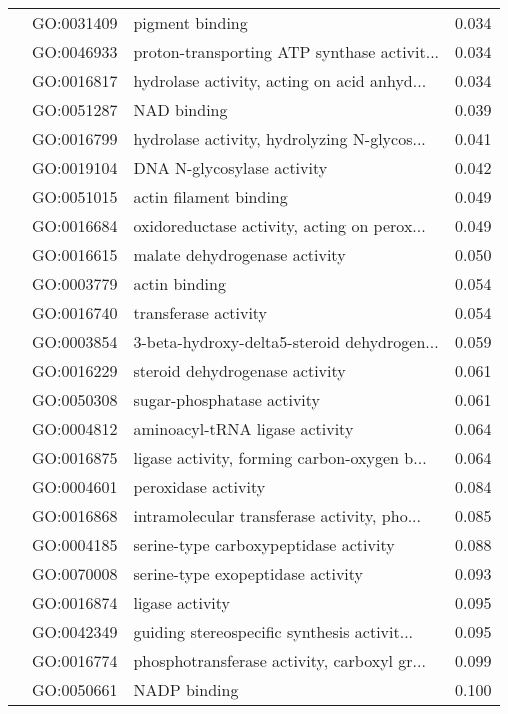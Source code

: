 \begin{longtable}{lllr}
   & GO:0031409 &                              pigment binding &         0.034 \\
   & GO:0046933 &  proton-transporting ATP synthase activit... &         0.034 \\
   & GO:0016817 &  hydrolase activity, acting on acid anhyd... &         0.034 \\
   & GO:0051287 &                                  NAD binding &         0.039 \\
   & GO:0016799 &  hydrolase activity, hydrolyzing N-glycos... &         0.041 \\
   & GO:0019104 &                   DNA N-glycosylase activity &         0.042 \\
   & GO:0051015 &                       actin filament binding &         0.049 \\
   & GO:0016684 &  oxidoreductase activity, acting on perox... &         0.049 \\
   & GO:0016615 &                malate dehydrogenase activity &         0.050 \\
   & GO:0003779 &                                actin binding &         0.054 \\
   & GO:0016740 &                         transferase activity &         0.054 \\
   & GO:0003854 &  3-beta-hydroxy-delta5-steroid dehydrogen... &         0.059 \\
   & GO:0016229 &               steroid dehydrogenase activity &         0.061 \\
   & GO:0050308 &                   sugar-phosphatase activity &         0.061 \\
   & GO:0004812 &               aminoacyl-tRNA ligase activity &         0.064 \\
   & GO:0016875 &  ligase activity, forming carbon-oxygen b... &         0.064 \\
   & GO:0004601 &                          peroxidase activity &         0.084 \\
   & GO:0016868 &  intramolecular transferase activity, pho... &         0.085 \\
   & GO:0004185 &        serine-type carboxypeptidase activity &         0.088 \\
   & GO:0070008 &            serine-type exopeptidase activity &         0.093 \\
   & GO:0016874 &                              ligase activity &         0.095 \\
   & GO:0042349 &  guiding stereospecific synthesis activit... &         0.095 \\
   & GO:0016774 &  phosphotransferase activity, carboxyl gr... &         0.099 \\
   & GO:0050661 &                                 NADP binding &         0.100 \\
\end{longtable}
